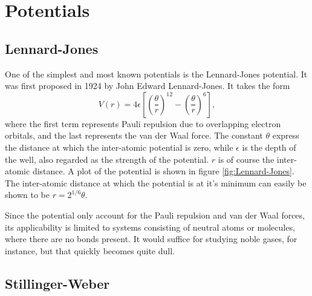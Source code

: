 \documentclass[twoside,english]{uiofysmaster}
\newcommand\lr[1]{\left(#1\right)}
\begin{document}
\section{Potentials}
\subsection{Lennard-Jones} \label{Lennard-Jones-section}
One of the simplest and most known potentials is the Lennard-Jones potential. It was first proposed in 1924 by John Edward Lennard-Jones.  It takes the form
\begin{equation}
	V(r) = 4\epsilon\left[\lr{\frac{\theta}{r}}^{12} -  \lr{\frac{\theta}{r}}^6 \right], \label{eq:Lennard-Jones}
\end{equation}
where the first term represents Pauli repulsion due to overlapping electron orbitals, and the last represents the van der Waal force. 
The constant $\theta$ express the distance at which the inter-atomic potential is zero, while $\epsilon$ is the depth of the well, also regarded as the strength of the potential.
$r$ is of course the inter-atomic distance. 
A plot of the potential is shown in figure \ref{fig:Lennard-Jones}.
The inter-atomic distance at which the potential is at it's minimum can easily be shown to be $r=2^{1/6}\theta$. 

\begin{figure}[H]
\end{figure}

Since the potential only account for the Pauli repulsion and van der Waal forces, its applicability is limited to systems consisting of neutral atoms or molecules, where there are no bonds present. It would suffice for studying noble gases, for instance, but that quickly becomes quite dull. 


 
\subsection{Stillinger-Weber}
\end{document}
